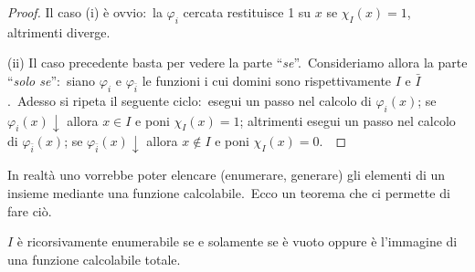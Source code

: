 \begin{proof}
    Il caso (i) è ovvio:\ la $\varphi_i$ cercata restituisce 1 su $x$ se $\chi_I(x)=1$, altrimenti diverge.\

    (ii) Il caso precedente basta per vedere la parte ``\textit{se}''.\
    Consideriamo allora la parte ``\textit{solo se}'':\ siano $\varphi_i$ e $\varphi_{\bar{i}}$ le funzioni i cui domini sono rispettivamente $I$ e $\bar{I}$.\
    Adesso si ripeta il seguente ciclo:\ esegui un passo nel calcolo di $\varphi_i(x)$; se $\varphi_i(x) \downarrow$ allora $x \in I$ e poni $\chi_I(x) = 1$; altrimenti esegui un passo nel calcolo di $\varphi_{\bar{i}}(x)$; se $\varphi_{\bar{i}}(x) \downarrow$ allora $x \notin I$ e poni $\chi_I(x)=0$.\
\end{proof}

\noindent In realtà uno vorrebbe poter elencare (enumerare, generare) gli elementi di un insieme mediante una funzione calcolabile.\
Ecco un teorema che ci permette di fare ciò.\

\begin{theorem}
    $I$ è ricorsivamente enumerabile se e solamente se è vuoto oppure è l'immagine di una funzione calcolabile totale.\
\end{theorem}

